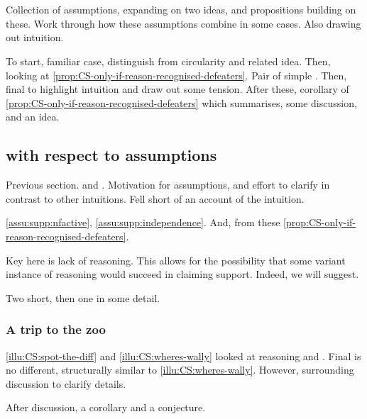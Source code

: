 \section{}
\label{sec:CS:illustrations}

\begin{note}
  Collection of assumptions, expanding on two ideas, and propositions building on these.
  Work through how these assumptions combine in some cases.
  Also drawing out intuition.

  To start, familiar case, distinguish from circularity and related idea.
  Then, looking at \autoref{prop:CS-only-if-reason-recognised-defeaters}.
  Pair of simple .
  Then, final  to highlight intuition and draw out some tension.
  After these, corollary of \autoref{prop:CS-only-if-reason-recognised-defeaters} which summarises, some discussion, and an idea.
\end{note}


\subsection{ with respect to assumptions}
\label{sec:illustrations-wrt-assumption}

\begin{note}
  Previous section.
  \ideaCSA{} and \ideaCSB{}.
  Motivation for assumptions, and effort to clarify in contrast to other intuitions.
  Fell short of an account of the intuition.

  \autoref{assu:supp:nfactive}, \autoref{assu:supp:independence}.
  And, from these \autoref{prop:CS-only-if-reason-recognised-defeaters}.

  Key here is lack of reasoning.
  This allows for the possibility that some variant instance of reasoning would succeed in claiming support.
  Indeed, we will suggest.
\end{note}

\begin{note}
  Two short, then one in some detail.
\end{note}



\subsubsection{A trip to the zoo}

\begin{note}
   \ref{illu:CS:spot-the-diff} and \ref{illu:CS:wheres-wally} looked at reasoning and .
  Final  is no different, structurally similar to \autoref{illu:CS:wheres-wally}.
  However, surrounding discussion to clarify details.

  After discussion, a corollary and a conjecture.
\end{note}

